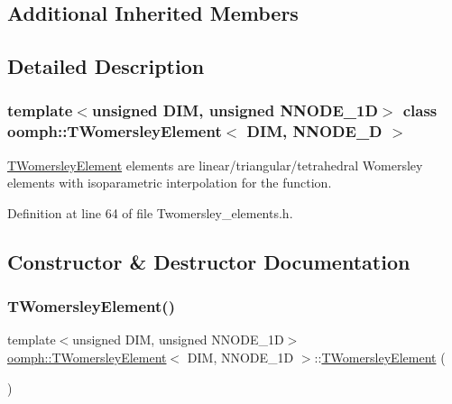 \subsection*{Additional Inherited Members}


\subsection{Detailed Description}
\subsubsection*{template$<$unsigned D\+IM, unsigned N\+N\+O\+D\+E\+\_\+1D$>$\newline
class oomph\+::\+T\+Womersley\+Element$<$ D\+I\+M, N\+N\+O\+D\+E\+\_\+D $>$}

\hyperlink{classoomph_1_1TWomersleyElement}{T\+Womersley\+Element} elements are linear/triangular/tetrahedral Womersley elements with isoparametric interpolation for the function. 

Definition at line 64 of file Twomersley\+\_\+elements.\+h.



\subsection{Constructor \& Destructor Documentation}
\mbox{\label{classoomph_1_1TWomersleyElement_a5dea12fa38a29c02bf0ddfcb3ba703f4}} 
\subsubsection{\texorpdfstring{T\+Womersley\+Element()}{TWomersleyElement()}\hspace{0.1cm}{\footnotesize\ttfamily [1/2]}}
{\footnotesize\ttfamily template$<$unsigned D\+IM, unsigned N\+N\+O\+D\+E\+\_\+1D$>$ \\
\hyperlink{classoomph_1_1TWomersleyElement}{oomph\+::\+T\+Womersley\+Element}$<$ D\+IM, N\+N\+O\+D\+E\+\_\+1D $>$\+::\hyperlink{classoomph_1_1TWomersleyElement}{T\+Womersley\+Element} (\begin{DoxyParamCaption}{ }\end{DoxyParamCaption})\hspace{0.3cm}{\ttfamily [inline]}}



